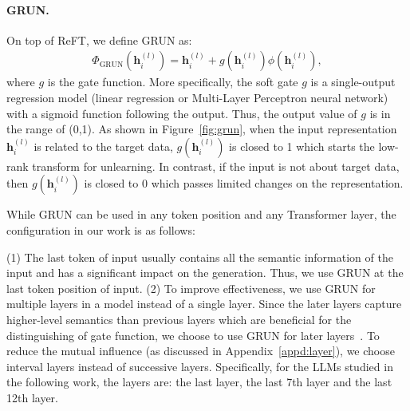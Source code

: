 \paragraph{GRUN.} 


On top of ReFT, we define GRUN as:
\begin{align}
    \Phi_{\text{GRUN}}(\boldsymbol{h}_i^{(l)})=\boldsymbol{h}_i^{(l)}+ g(\boldsymbol{h}_i^{(l)}) \phi(\boldsymbol{h}_i^{(l)}),
\end{align}
where $g$ is the gate function. More specifically, the soft gate $g$ is a single-output regression model (linear regression or Multi-Layer Perceptron neural network) with a sigmoid function following the output. Thus, the output value of $g$ is in the range of (0,1). As shown in Figure~\ref{fig:grun}, when the input representation $\boldsymbol{h}_i^{(l)}$ is related to the target data, $g(\boldsymbol{h}_i^{(l)})$ is closed to 1 which starts the low-rank transform for unlearning. In contrast, if the input is not about target data, then $g(\boldsymbol{h}_i^{(l)})$ is closed to 0 which passes limited changes on the representation.


{While GRUN can be used in any token position and any Transformer layer, the configuration in our work is as follows:}

(1) The last token of input usually contains all the semantic information of the input and has a significant impact on the generation. Thus, we use GRUN at the last token position of input.
(2) 
To improve effectiveness, we use GRUN for multiple layers in a model instead of a single layer.
Since the later layers capture higher-level semantics than previous layers which are beneficial for the distinguishing of gate function, we choose to use GRUN for later layers~\cite{peng2018large, jin2025exploring}. To reduce the mutual influence (as discussed in Appendix~\ref{appd:layer}), we choose interval layers instead of successive layers. 
Specifically, for the LLMs studied in the following work, the layers are: the last layer, the last 7th layer and the last 12th layer.


